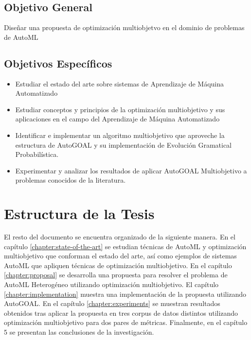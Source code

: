 \subsection*{Objetivo General}
Dise\~nar una propuesta de optimizaci\'on multiobjetvo en el dominio de problemas de AutoML
\subsection*{Objetivos Espec\'ificos}
\begin{itemize}
    \item Estudiar el estado del arte sobre sistemas de Aprendizaje de M\'aquina Automatizado
    \item Estudiar conceptos y principios de la optimizaci\'on multiobjetivo y sus aplicaciones en el campo del Aprendizaje de M\'aquina Automatizado
    \item Identificar e implementar un algoritmo multiobjetivo que aproveche la estructura de AutoGOAL y su implementaci\'on de Evoluci\'on Gramatical Probabil\'istica.
    \item Experimentar y analizar los resultados de aplicar AutoGOAL Multiobjetivo a problemas conocidos de la literatura.
\end{itemize}

\section*{Estructura de la Tesis}
El resto del documento se encuentra organizado de la siguiente manera. En el cap\'itulo \ref{chapter:state-of-the-art} se estudian t\'ecnicas de AutoML y optimizaci\'on multiobjetivo que conforman el estado del arte, as\'i como ejemplos de sistemas AutoML que apliquen t\'ecnicas de optimizaci\'on multiobjetivo. En el cap\'itulo \ref{chapter:proposal} se desarrolla una propuesta para resolver el problema de AutoML Heterog\'eneo utilizando optimizaci\'on multiobjetivo. El cap\'itulo \ref{chapter:implementation} muestra una implementaci\'on de la propuesta utilizando AutoGOAL. En el cap\'itulo \ref{chapter:experiments} se muestran resultados obtenidos tras aplicar la propuesta en tres corpus de datos distintos utilizando optimizaci\'on multiobjetivo para dos pares de m\'etricas. 
Finalmente, en el cap\'itulo 5 se presentan las conclusiones de la investigaci\'on.
